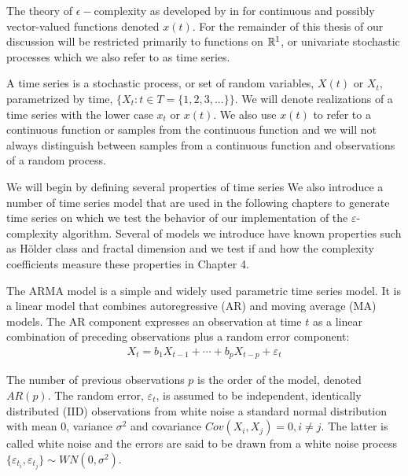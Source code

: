   The theory 
  of $\epsilon-$complexity as developed by in \cite{darkhovsky2013} for continuous and possibly vector-valued functions 
  denoted $x(t)$. For the remainder of this thesis of our discussion will be restricted primarily to functions on $\mathbb R^1$, or univariate stochastic processes which we also refer to as time series. 

  A time series is a stochastic process, or set of random 
  variables, $X(t)$ or $X_t$, parametrized by time, 
  $\{ X_t: t \in T = \{ 1,2,3,... \}\}$.  
   We will denote realizations of a time series
   with the lower case 
  $x_t$ or $x(t)$. We also use $x(t)$ to refer to a continuous function or samples from the continuous function and we will not always distinguish between samples from a continuous function and observations of a random process. 

  We will begin by defining several 
  properties of time series 
  We also introduce a number of time series model
  that are used in the following chapters to 
  generate time series on which we 
   test the behavior of our implementation 
  of the $\varepsilon$-complexity algorithm. 
  Several of models we introduce have known 
  properties such as H\"older class and fractal 
  dimension and we test if and how the complexity coefficients
   measure these properties in Chapter 4.

  The ARMA model is a simple and widely used parametric time series model. It is a linear model
  that combines autoregressive (AR) and moving average (MA)
  models. The AR component expresses an observation at time 
  $t$ as a linear combination
  of preceding observations plus a random error component:
  \begin{align}
      X_t  = b_1 X_{t-1} + \cdots + b_p X_{t-p} + \varepsilon_t
  \end{align}
  
  The number of previous observations $p$ is the order of the 
  model, denoted $AR(p)$. The random error, $\varepsilon_t$, 
  is assumed to be independent, identically distributed (IID) observations from white noise a standard normal distribution with 
  mean 0, variance $\sigma^2$ and covariance 
  $Cov(X_i, X_j) = 0, i \neq j$. The latter is called 
  white noise and the errors are said to be 
  drawn from a white noise process 
  $\{ \varepsilon_{t_i}, \varepsilon_{t_j}\} \sim WN(0, \sigma^2)$. 

